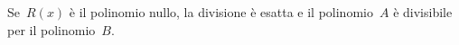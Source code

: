 
Se~\(R(x)\) è il polinomio nullo, la divisione è esatta e il polinomio~\(A\) 
è divisibile per il polinomio~\(B\).

% 
%  
% 
% 

